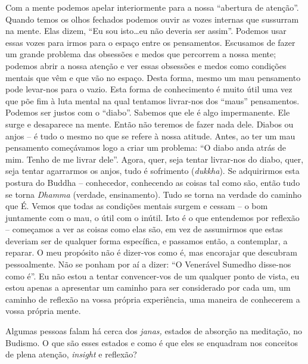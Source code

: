 Com a mente podemos apelar interiormente para a nossa ``abertura de
atenção''. Quando temos os olhos fechados podemos ouvir as vozes
internas que sussurram na mente. Elas dizem, ``Eu sou isto\ldots{}eu não
deveria ser assim''. Podemos usar essas vozes para irmos para o espaço
entre os pensamentos. Escusamos de fazer um grande problema das
obsessões e medos que percorrem a nossa mente; podemos abrir a nossa
atenção e ver essas obsessões e medos como condições mentais que vêm e
que vão no espaço. Desta forma, mesmo um mau pensamento pode levar-nos
para o vazio. Esta forma de conhecimento é muito útil uma vez que põe
fim à luta mental na qual tentamos livrar-nos dos ``maus'' pensamentos.
Podemos ser justos com o ``diabo''. Sabemos que ele é algo impermanente.
Ele surge e desaparece na mente. Então não teremos de fazer nada dele.
Diabos ou anjos -- é tudo o mesmo no que se refere à nossa atitude.
Antes, ao ter um mau pensamento começávamos logo a criar um problema:
``O diabo anda atrás de mim. Tenho de me livrar dele''. Agora, quer,
seja tentar livrar-nos do diabo, quer, seja tentar agarrarmos os anjos,
tudo é sofrimento (\emph{dukkha}). Se adquirirmos esta postura do Buddha
-- conhecedor, conhecendo as coisas tal como são, então tudo se torna
\emph{Dhamma} (verdade, ensinamento). Tudo se torna na verdade do
caminho que É. Vemos que todas as condições mentais surgem e cessam -- o
bom juntamente com o mau, o útil com o inútil. Isto é o que entendemos
por reflexão -- começamos a ver as coisas como elas são, em vez de
assumirmos que estas deveriam ser de qualquer forma específica, e
passamos então, a contemplar, a reparar. O meu propósito não é dizer-vos
como é, mas encorajar que descubram pessoalmente. Não se ponham por aí a
dizer: ``O Venerável Sumedho disse-nos como é''. Eu não estou a tentar
convencer-vos de um qualquer ponto de vista, eu estou apenas a
apresentar um caminho para ser considerado por cada um, um caminho de
reflexão na vossa própria experiência, uma maneira de conhecerem a vossa
própria mente.

\bigskip

 Algumas pessoas falam há cerca dos \emph{janas,} estados de
absorção na meditação, no Budismo. O que são esses estados e como é que
eles se enquadram nos conceitos de plena atenção, \emph{insight} e
reflexão?

